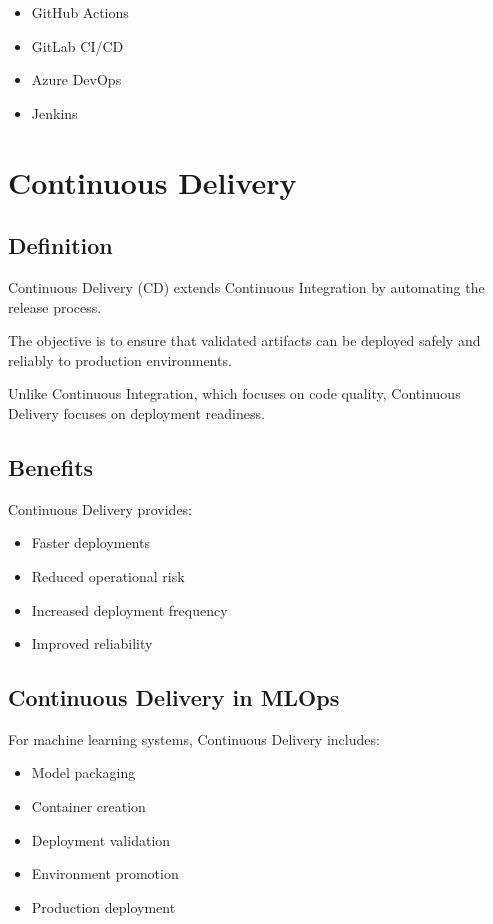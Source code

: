 \begin{itemize}
    \item GitHub Actions
    \item GitLab CI/CD
    \item Azure DevOps
    \item Jenkins
\end{itemize}

\section{Continuous Delivery}

\subsection{Definition}

Continuous Delivery (CD) extends Continuous Integration by automating the release process.

The objective is to ensure that validated artifacts can be deployed safely and reliably to production environments.

Unlike Continuous Integration, which focuses on code quality, Continuous Delivery focuses on deployment readiness.

\subsection{Benefits}

Continuous Delivery provides:

\begin{itemize}
    \item Faster deployments
    \item Reduced operational risk
    \item Increased deployment frequency
    \item Improved reliability
\end{itemize}

\subsection{Continuous Delivery in MLOps}

For machine learning systems, Continuous Delivery includes:

\begin{itemize}
    \item Model packaging
    \item Container creation
    \item Deployment validation
    \item Environment promotion
    \item Production deployment
\end{itemize}


